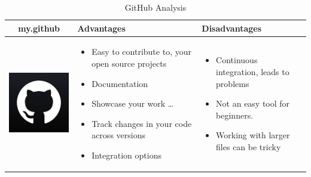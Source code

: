 \documentclass{article}
\begin{document}
 
	\begin{table}[h!] 
		\centering 
		\begin{tabular}{|c|m{5cm}|m{5cm}|}
			 \hline my.github & Advantages & Disadvantages \\ 
			 \hline 
			 \begin{minipage}{.4\textwidth} 
			 	\includegraphics[width=\linewidth, height=40mm]{github} 
		 	\end{minipage} 
	 	 &
	 			\begin{itemize} 
	 				\item Easy to contribute to, your open source projects 
	 				\item Documentation 
	 				\item Showcase your work 
	 				\ldots 
	 				\item Track changes in your code across versions 
	 				\item Integration options 
	 			\end{itemize} 
 			& 
 			\begin{itemize} 
 				\item Continuous integration, leads to problems 
 				\item Not an easy tool for beginners. 
 				\item Working with larger files can be tricky 
 			\end{itemize} \\ \hline
 \end{tabular} 
		\caption{GitHub Analysis}
		\label{tbl:mygitHub} 
		\end{table} 
\end{document}
